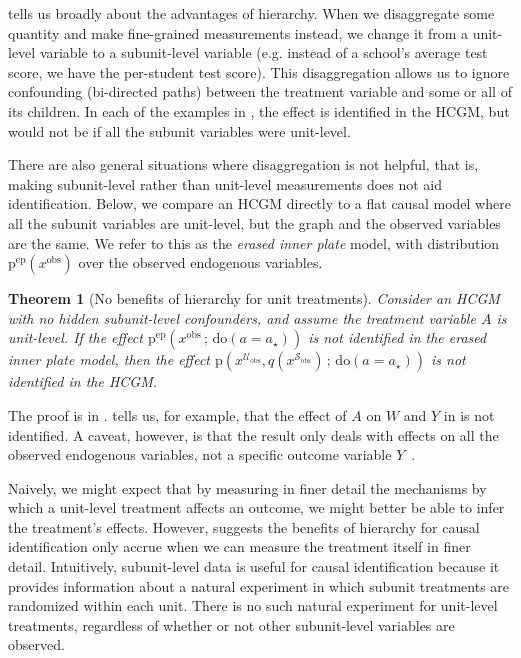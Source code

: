 \documentclass[12pt]{article}
\newtheorem{theorem}{Theorem}
\newcommand{\Sc}{\mathcal{S}}
\newcommand{\Uc}{\mathcal{U}}
\newcommand{\rmdo}{\mathrm{do}}
\newcommand{\s}{\, ; \,}
\newcommand{\pr}{\mathrm{p}}
\newcommand{\obs}{\mathrm{obs}}
\newcommand{\ep}{\mathrm{ep}}
\begin{document}
 tells us broadly about the advantages of hierarchy. 
When we disaggregate some quantity and make fine-grained measurements instead, we change it from a unit-level variable to a subunit-level variable (e.g. instead of a school's average test score, we have the per-student test score).
This disaggregation allows us to ignore confounding (bi-directed paths) between the treatment variable and some or all of its children.
In each of the examples in , the effect is identified in the HCGM, but would not be if all the subunit variables were unit-level.

There are also general situations where disaggregation is not helpful, that is, making subunit-level rather than unit-level measurements does not aid identification. Below, we compare an HCGM directly to a flat causal model where all the subunit variables are unit-level, but the graph and the observed variables are the same. We refer to this as the \textit{erased inner plate} model, with distribution $\pr^\ep(x^\obs)$ over the observed endogenous variables.
\begin{theorem}[No benefits of hierarchy for unit treatments] \label{thm:unit-level-noID}
  Consider an HCGM with no hidden subunit-level confounders, and assume the treatment variable $A$ is unit-level. 
  If the effect $\pr^\ep(x^\obs \s \rmdo(a = a_\star))$ is not identified in the erased inner plate model, then the effect $\pr(x^{\Uc_\obs}, q(x^{\Sc_\obs}) \s \rmdo(a = a_\star))$ is not identified in the HCGM.
\end{theorem}
\noindent The proof is in .
 tells us, for example, that the effect of $A$ on $W$ and $Y$ in  is not identified.
A caveat, however, is that the result only deals with effects on all the observed endogenous variables, not a specific outcome variable $Y$~\citep{Tian2002-xr}.

Naively, we might expect that by measuring in finer detail the mechanisms by which a unit-level treatment affects an outcome, we might better be able to infer the treatment's effects. However,  suggests the benefits of hierarchy for causal identification only accrue when we can measure the treatment itself in finer detail.
Intuitively, subunit-level data is useful for causal identification because it provides information about a natural experiment in which subunit treatments are randomized within each unit.
There is no such natural experiment for unit-level treatments, regardless of whether or not other subunit-level variables are observed.
\end{document}
